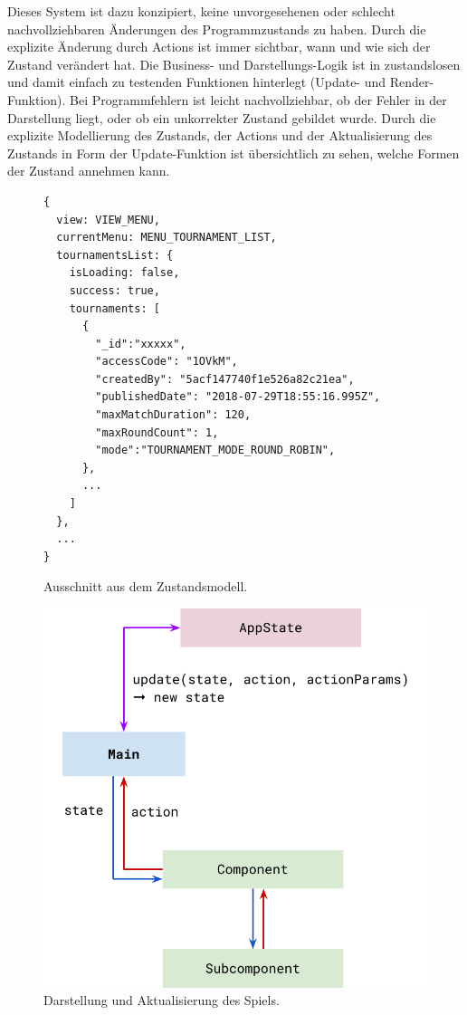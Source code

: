 Dieses System ist dazu konzipiert, keine unvorgesehenen oder schlecht nachvollziehbaren Änderungen
des Programmzustands zu haben. Durch die explizite Änderung durch Actions ist immer sichtbar, wann
und wie sich der Zustand verändert hat. Die Business- und Darstellungs-Logik ist in zustandslosen
und damit einfach zu testenden Funktionen hinterlegt (Update- und Render-Funktion). Bei
Programmfehlern ist leicht nachvollziehbar, ob der Fehler in der Darstellung liegt, oder ob ein
unkorrekter Zustand gebildet wurde. Durch die explizite Modellierung des Zustands, der Actions und
der Aktualisierung des Zustands in Form der Update-Funktion ist übersichtlich zu sehen, welche
Formen der Zustand annehmen kann.


\begin{figure}
  \begin{lstlisting}
{
  view: VIEW_MENU,
  currentMenu: MENU_TOURNAMENT_LIST,
  tournamentsList: {
    isLoading: false,
    success: true,
    tournaments: [
      {
        "_id":"xxxxx",
        "accessCode": "1OVkM",
        "createdBy": "5acf147740f1e526a82c21ea",
        "publishedDate": "2018-07-29T18:55:16.995Z",
        "maxMatchDuration": 120,
        "maxRoundCount": 1,
        "mode":"TOURNAMENT_MODE_ROUND_ROBIN",
      },
      ...
    ]
  },
  ...
}
  \end{lstlisting}

  \caption{Ausschnitt aus dem Zustandsmodell.}

  \label{state-model}
\end{figure}

\begin{figure}
  \includegraphics{figures/statemanagement-flow.pdf}

  \caption{Darstellung und Aktualisierung des Spiels.}

  \label{update-loop-diagram}
\end{figure}

